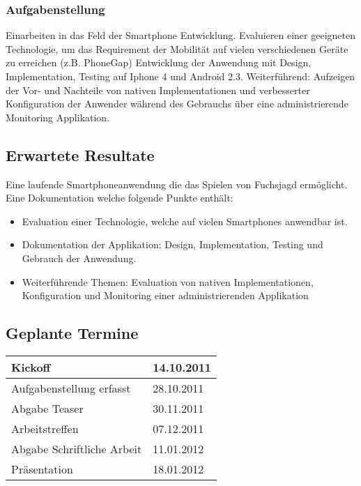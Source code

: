 \subsubsection{Aufgabenstellung} %
\label{ssub:Aufgabenstellung}
Einarbeiten in das Feld der Smartphone Entwicklung.
Evaluieren einer geeigneten Technologie, um das Requirement der Mobilität auf vielen verschiedenen Geräte zu erreichen (z.B. PhoneGap)
Entwicklung der Anwendung mit Design, Implementation, Testing auf Iphone 4 und Android 2.3.
Weiterführend:
Aufzeigen der Vor- und Nachteile von nativen Implementationen und verbesserter Konfiguration der Anwender während des Gebrauchs über eine administrierende Monitoring Applikation.

\subsection{Erwartete Resultate} %
\label{sub:Erwartete Resultate}
Eine laufende Smartphoneanwendung die das Spielen von Fuchsjagd ermöglicht.
Eine Dokumentation welche folgende Punkte enthält:
\begin{itemize}
    \item Evaluation einer Technologie, welche auf vielen Smartphones anwendbar ist.
    \item Dokumentation der Applikation: Design, Implementation, Testing und Gebrauch der Anwendung.
    \item Weiterführende Themen: Evaluation von nativen Implementationen, Konfiguration und Monitoring einer administrierenden Applikation
\end{itemize}


\subsection{Geplante Termine} %
\label{sub:Geplante Termine}

\begin{tabular}{|l|l|}
\hline
                   Kickoff & 14.10.2011\\
\hline
  Aufgabenstellung erfasst & 28.10.2011\\
\hline
             Abgabe Teaser & 30.11.2011\\
\hline
            Arbeitstreffen &  07.12.2011\\
\hline
Abgabe Schriftliche Arbeit &  11.01.2012\\
\hline
             Präsentation &  18.01.2012\\
\hline
\end{tabular}

